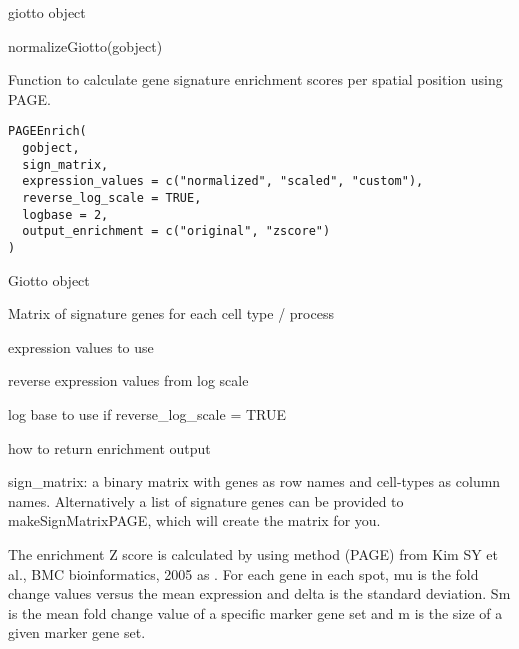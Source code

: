 \documentclass[a4paper]{book}
\begin{document}
%
\begin{Value}
giotto object
\end{Value}
%
\begin{Examples}
\begin{ExampleCode}
    normalizeGiotto(gobject)
\end{ExampleCode}
\end{Examples}
%
\begin{Description}\relax
Function to calculate gene signature enrichment scores per spatial position using PAGE.
\end{Description}
%
\begin{Usage}
\begin{verbatim}
PAGEEnrich(
  gobject,
  sign_matrix,
  expression_values = c("normalized", "scaled", "custom"),
  reverse_log_scale = TRUE,
  logbase = 2,
  output_enrichment = c("original", "zscore")
)
\end{verbatim}
\end{Usage}
%
\begin{Arguments}
\begin{ldescription}
\item[\code{gobject}] Giotto object

\item[\code{sign\_matrix}] Matrix of signature genes for each cell type / process

\item[\code{expression\_values}] expression values to use

\item[\code{reverse\_log\_scale}] reverse expression values from log scale

\item[\code{logbase}] log base to use if reverse\_log\_scale = TRUE

\item[\code{output\_enrichment}] how to return enrichment output
\end{ldescription}
\end{Arguments}
%
\begin{Details}\relax
sign\_matrix: a binary matrix with genes as row names and cell-types as column names.
Alternatively a list of signature genes can be provided to makeSignMatrixPAGE, which will create
the matrix for you. \\{}

The enrichment Z score is calculated by using method (PAGE) from
Kim SY et al., BMC bioinformatics, 2005 as .
For each gene in each spot, mu is the fold change values versus the mean expression
and delta is the standard deviation. Sm is the mean fold change value of a specific marker gene set
and  m is the size of a given marker gene set.
\end{Details}
\end{document}
